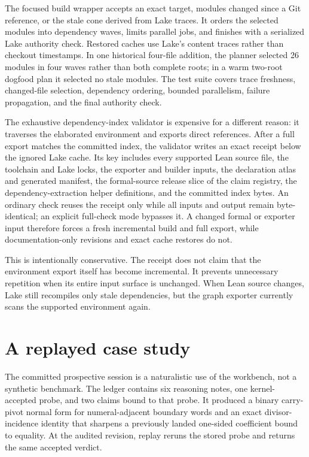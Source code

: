 \documentclass[11pt]{article}
\begin{document}
The focused build wrapper accepts an exact target, modules changed since a Git
reference, or the stale cone derived from Lake traces. It orders the selected
modules into dependency waves, limits parallel jobs, and finishes with a
serialized Lake authority check. Restored caches use Lake's content traces
rather than checkout timestamps. In one historical four-file addition, the
planner selected 26 modules in four waves rather than both complete roots; in a
warm two-root dogfood plan it selected no stale modules. The test suite covers
trace freshness, changed-file selection, dependency ordering, bounded
parallelism, failure propagation, and the final authority check.

The exhaustive dependency-index validator is expensive for a different
reason: it traverses the elaborated environment and exports direct
references. After a full export matches the committed index, the validator
writes an exact receipt below the ignored Lake cache. Its key includes every
supported Lean source file, the toolchain and Lake locks, the exporter and
builder inputs, the declaration atlas and generated manifest, the formal-source
release slice of the claim registry, the dependency-extraction helper
definitions, and the committed index bytes. An ordinary check reuses the receipt
only while all inputs and output
remain byte-identical; an explicit full-check mode bypasses it. A changed
formal or exporter input therefore forces a fresh incremental build and full
export, while documentation-only revisions and exact cache restores do not.

This is intentionally conservative. The receipt does not claim that the
environment export itself has become incremental. It prevents unnecessary
repetition when its entire input surface is unchanged. When Lean source
changes, Lake still recompiles only stale dependencies, but the graph exporter
currently scans the supported environment again.

\section{A replayed case study}\label{sec:dogfood}

The committed prospective session is a naturalistic use of the workbench, not
a synthetic benchmark. The ledger contains six reasoning notes, one
kernel-accepted probe, and two claims bound to that probe. It produced a binary
carry-pivot normal form for numeral-adjacent boundary words and an exact
divisor-incidence identity that sharpens a previously landed one-sided
coefficient bound to equality. At the audited revision, replay reruns the
stored probe and returns the same accepted verdict.
\end{document}
